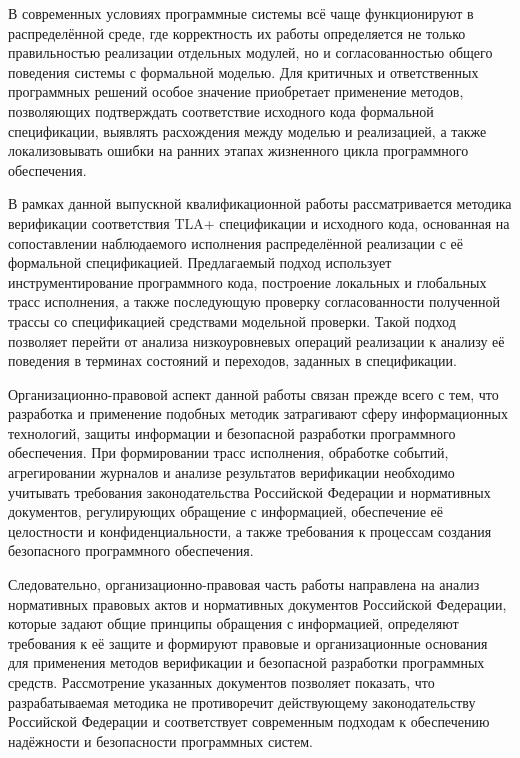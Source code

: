 \introduction %

В современных условиях программные системы всё чаще функционируют в
распределённой среде, где корректность их работы определяется не только
правильностью реализации отдельных модулей, но и согласованностью общего
поведения системы с формальной моделью. Для критичных и ответственных
программных решений особое значение приобретает применение методов,
позволяющих подтверждать соответствие исходного кода формальной
спецификации, выявлять расхождения между моделью и реализацией, а также
локализовывать ошибки на ранних этапах жизненного цикла программного
обеспечения.

В рамках данной выпускной квалификационной работы рассматривается методика
верификации соответствия TLA+ спецификации и исходного кода, основанная на
сопоставлении наблюдаемого исполнения распределённой реализации с её
формальной спецификацией. Предлагаемый подход использует
инструментирование программного кода, построение локальных и глобальных
трасс исполнения, а также последующую проверку согласованности полученной
трассы со спецификацией средствами модельной проверки. Такой подход
позволяет перейти от анализа низкоуровневых операций реализации к анализу
её поведения в терминах состояний и переходов, заданных в спецификации.

Организационно-правовой аспект данной работы связан прежде всего с тем,
что разработка и применение подобных методик затрагивают сферу
информационных технологий, защиты информации и безопасной разработки
программного обеспечения. При формировании трасс исполнения, обработке
событий, агрегировании журналов и анализе результатов верификации
необходимо учитывать требования законодательства Российской Федерации и
нормативных документов, регулирующих обращение с информацией, обеспечение
её целостности и конфиденциальности, а также требования к процессам
создания безопасного программного обеспечения.

Следовательно, организационно-правовая часть работы направлена на анализ
нормативных правовых актов и нормативных документов Российской Федерации,
которые задают общие принципы обращения с информацией, определяют
требования к её защите и формируют правовые и организационные основания
для применения методов верификации и безопасной разработки программных
средств. Рассмотрение указанных документов позволяет показать, что
разрабатываемая методика не противоречит действующему законодательству
Российской Федерации и соответствует современным подходам к обеспечению
надёжности и безопасности программных систем.


